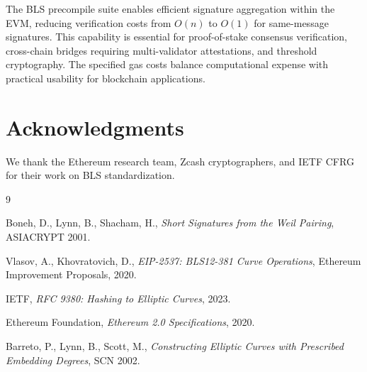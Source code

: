 \documentclass[11pt,a4paper]{article}
\theoremstyle{definition}
\begin{document}
The BLS precompile suite enables efficient signature aggregation within the EVM, reducing verification costs from $O(n)$ to $O(1)$ for same-message signatures. This capability is essential for proof-of-stake consensus verification, cross-chain bridges requiring multi-validator attestations, and threshold cryptography. The specified gas costs balance computational expense with practical usability for blockchain applications.

\section*{Acknowledgments}

We thank the Ethereum research team, Zcash cryptographers, and IETF CFRG for their work on BLS standardization.


\begin{thebibliography}{9}

Boneh, D., Lynn, B., Shacham, H.,
\textit{Short Signatures from the Weil Pairing},
ASIACRYPT 2001.

Vlasov, A., Khovratovich, D.,
\textit{EIP-2537: BLS12-381 Curve Operations},
Ethereum Improvement Proposals, 2020.

IETF,
\textit{RFC 9380: Hashing to Elliptic Curves},
2023.

Ethereum Foundation,
\textit{Ethereum 2.0 Specifications},
2020.

Barreto, P., Lynn, B., Scott, M.,
\textit{Constructing Elliptic Curves with Prescribed Embedding Degrees},
SCN 2002.

\end{thebibliography}
\end{document}
